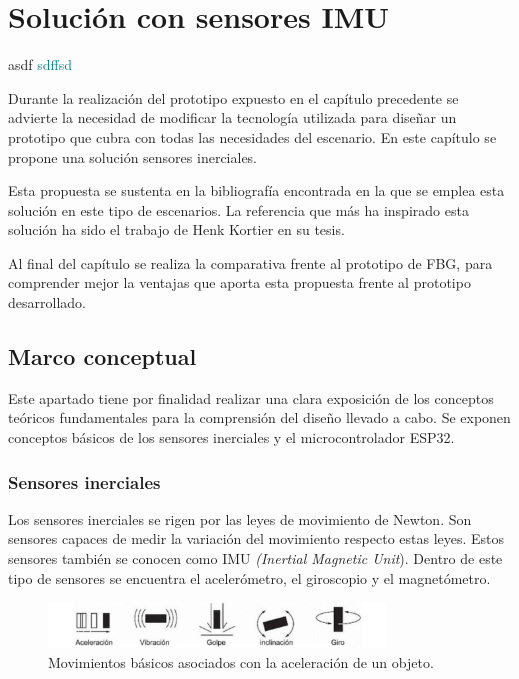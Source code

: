 \chapter{Solución con sensores IMU\label{sec:IMU}}

\textcolor{rositaoscuro}{asdf}
\textcolor{teal}{sdffsd}

\label{sec:IMU4}

Durante la realización del prototipo expuesto en el capítulo precedente se advierte la necesidad de modificar la tecnología utilizada para diseñar un prototipo que cubra con todas las necesidades del escenario. En este capítulo se propone una solución sensores inerciales. 

Esta propuesta se sustenta en la bibliografía encontrada en la que se emplea esta solución en este tipo de escenarios. La referencia que más ha inspirado esta solución ha sido el trabajo de Henk Kortier en su tesis. \cite{Kortier} 

Al final del capítulo se realiza la comparativa frente al prototipo de FBG, para comprender mejor la ventajas que aporta esta propuesta frente al prototipo desarrollado. 

\section{Marco conceptual}
\label{sec:marco4}

Este apartado tiene por finalidad realizar una clara exposición de los conceptos teóricos fundamentales para la comprensión del diseño llevado a cabo. Se exponen conceptos básicos de los sensores inerciales y el microcontrolador ESP32.  


\subsection{Sensores inerciales}
\label{sec:asdf4}

Los sensores inerciales se rigen por las leyes de movimiento de Newton. Son sensores capaces de medir la variación del movimiento respecto estas leyes. Estos sensores también se conocen como IMU \textit{(Inertial Magnetic Unit}).
Dentro de este tipo de sensores se encuentra el acelerómetro, el giroscopio y el magnetómetro.

\begin{figure}[H]
	\centering
	\includegraphics[width=0.8\textwidth]{./img/movimientoAcelera}
	\caption{Movimientos básicos asociados con la aceleración de un objeto. \cite{juanDiego}} 
	\label{fig:movimientosAcelera}
\end{figure} 


